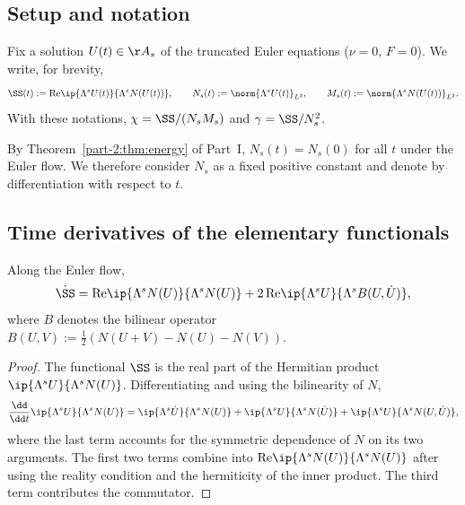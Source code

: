 \subsection{Setup and notation}
\label{part-2:ssec:setup-chi}

Fix a solution $U(t)\in\AA_s$ of the truncated Euler equations 
($\nu=0$, $F=0$). We write, for brevity,
\begin{equation}\label{part-2:eq:notations-SNM}
\SS(t) := \mathrm{Re}\ip{\Lambda^s U(t)}{\Lambda^s N(U(t))},
\qquad
N_s(t) := \norm{\Lambda^s U(t)}_{L^2},
\qquad
M_s(t) := \norm{\Lambda^s N(U(t))}_{L^2}.
\end{equation}
With these notations, $\chi = \SS/(N_s M_s)$ and 
$\gamma = \SS/N_s^2$.

By Theorem~\ref{part-2:thm:energy} of Part~I, $N_s(t) = N_s(0)$ for all $t$ 
under the Euler flow. We therefore consider $N_s$ as a fixed positive 
constant and denote by $\dot{}$ differentiation with respect to $t$.

\subsection{Time derivatives of the elementary functionals}
\label{part-2:ssec:derivatives}

\begin{lemma}[Derivative of $\SS$]\label{part-2:lem:dS}
Along the Euler flow,
\begin{equation}\label{part-2:eq:dS}
\dot{\SS} = \mathrm{Re}\ip{\Lambda^s N(U)}{\Lambda^s N(U)}
+ 2\,\mathrm{Re}\ip{\Lambda^s U}{\Lambda^s B(U,\dot U)},
\end{equation}
where $B$ denotes the bilinear operator $B(U,V) := \tfrac12(N(U+V) - N(U) - N(V))$.
\end{lemma}

\begin{proof}
The functional $\SS$ is the real part of the Hermitian product 
$\ip{\Lambda^s U}{\Lambda^s N(U)}$. Differentiating and using the 
bilinearity of $N$,
\begin{equation*}
\frac{\dd}{\dd t}\ip{\Lambda^s U}{\Lambda^s N(U)}
= \ip{\Lambda^s \dot U}{\Lambda^s N(U)}
+ \ip{\Lambda^s U}{\Lambda^s N(\dot U)}
+ \ip{\Lambda^s U}{\Lambda^s N(U,\dot U)},
\end{equation*}
where the last term accounts for the symmetric dependence of $N$ on 
its two arguments. The first two terms combine into 
$\mathrm{Re}\ip{\Lambda^s N(U)}{\Lambda^s N(U)}$ after using the 
reality condition and the hermiticity of the inner product. The third 
term contributes the commutator.
\end{proof}

